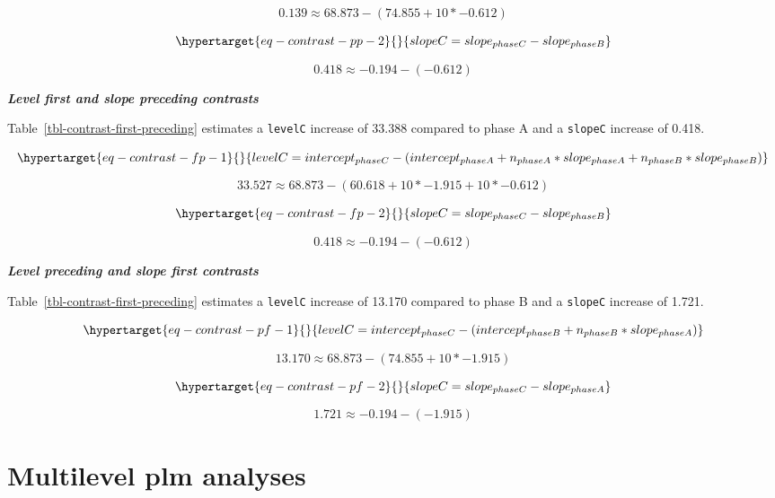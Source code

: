 \documentclass[
  letterpaper,
  DIV=11,
  numbers=noendperiod]{scrreprt}
\begin{document}
\[0.139 \approx 68.873 - (74.855 + 10*-0.612)\]

\begin{equation}\protect\hypertarget{eq-contrast-pp-2}{}{
slopeC = slope_{phaseC} - slope_{phaseB}
}\label{eq-contrast-pp-2}\end{equation}

\[0.418 \approx -0.194 - (-0.612)\]

\textbf{\emph{Level first and slope preceding contrasts}}

Table~\ref{tbl-contrast-first-preceding} estimates a \texttt{levelC}
increase of 33.388 compared to phase A and a \texttt{slopeC} increase of
0.418.

\begin{equation}\protect\hypertarget{eq-contrast-fp-1}{}{
levelC = intercept_{phaseC} - (intercept_{phaseA}  + n_{phaseA} * slope_{phaseA} + n_{phaseB} * slope_{phaseB})
}\label{eq-contrast-fp-1}\end{equation}

\[
33.527 \approx 68.873 - (60.618 + 10 * -1.915 + 10 * -0.612)
\]

\begin{equation}\protect\hypertarget{eq-contrast-fp-2}{}{
slopeC = slope_{phaseC} - slope_{phaseB}
}\label{eq-contrast-fp-2}\end{equation}

\[0.418 \approx -0.194 - (-0.612)\]

\textbf{\emph{Level preceding and slope first contrasts}}

Table~\ref{tbl-contrast-first-preceding} estimates a \texttt{levelC}
increase of 13.170 compared to phase B and a \texttt{slopeC} increase of
1.721.

\begin{equation}\protect\hypertarget{eq-contrast-pf-1}{}{
levelC = intercept_{phaseC} - (intercept_{phaseB} + n_{phaseB} * slope_{phaseA})
}\label{eq-contrast-pf-1}\end{equation}

\[
13.170\approx 68.873 - (74.855 + 10*-1.915)
\]

\begin{equation}\protect\hypertarget{eq-contrast-pf-2}{}{
slopeC = slope_{phaseC} - slope_{phaseA}
}\label{eq-contrast-pf-2}\end{equation}

\[
1.721 \approx -0.194 - (-1.915)
\]

\hypertarget{sec-hplm}{%
\chapter{Multilevel plm analyses}\label{sec-hplm}}
\end{document}
